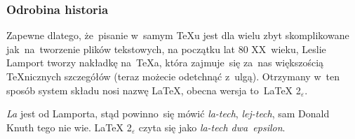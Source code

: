 \documentclass[10pt,t]{beamer}
\begin{document}
\begin{frame}
  \frametitle{Odrobina historia}

  Zapewne dlatego, że~pisanie w~samym \TeX u jest dla wielu zbyt
  skomplikowane jak~na~tworzenie plików tekstowych, na początku lat 80
  XX~wieku, Leslie Lamport tworzy nakładkę na~\TeX a, która zajmuje~się
  za~nas większością \TeX nicznych szczegółów (teraz możecie odetchnąć
  z~ulgą). Otrzymany w~ten sposób system składu nosi nazwę \LaTeX,
  obecna wersja to~\LaTeX{} 2$_{ \varepsilon }$.

  \textit{La} jest od Lamporta, stąd powinno~się mówić \textit{la-tech},
  \textit{lej-tech}, sam Donald Knuth tego nie wie.
  \LaTeX{} 2$_{ \varepsilon }$ czyta się jako \textit{la-tech dwa~epsilon}.

\end{frame}
\end{document}
